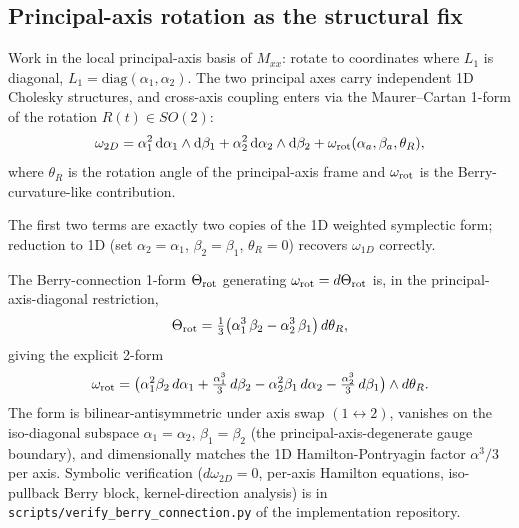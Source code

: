 \documentclass[11pt]{article}
\newcommand{\dd}{\mathrm{d}}
\begin{document}
\subsection{Principal-axis rotation as the structural fix}

Work in the local principal-axis basis of $M_{xx}$: rotate to
coordinates where $L_1$ is diagonal, $L_1 = \mathrm{diag}(\alpha_1,
\alpha_2)$. The two principal axes carry independent 1D Cholesky
structures, and cross-axis coupling enters via the Maurer--Cartan
1-form of the rotation $R(t)\in SO(2)$:
\begin{equation}
  \omega_{2D} = \alpha_1^2\,\dd\alpha_1\wedge\dd\beta_1
  + \alpha_2^2\,\dd\alpha_2\wedge\dd\beta_2 + \omega_{\rm rot}(\alpha_a,\beta_a,\theta_R),
  \label{eq:omega-2D}
\end{equation}
where $\theta_R$ is the rotation angle of the principal-axis frame
and $\omega_{\rm rot}$ is the Berry-curvature-like contribution.

The first two terms are exactly two copies of the 1D weighted
symplectic form; reduction to 1D (set $\alpha_2=\alpha_1$,
$\beta_2=\beta_1$, $\theta_R=0$) recovers $\omega_{1D}$ correctly.

The Berry-connection 1-form $\Theta_{\rm rot}$ generating
$\omega_{\rm rot} = d\Theta_{\rm rot}$ is, in the principal-axis-diagonal restriction,
\begin{equation}
  \Theta_{\rm rot} = \tfrac{1}{3}\bigl(\alpha_1^3\,\beta_2 - \alpha_2^3\,\beta_1\bigr)\,d\theta_R,
  \label{eq:Theta-rot-2D}
\end{equation}
giving the explicit 2-form
\begin{equation}
  \omega_{\rm rot} = \bigl(\alpha_1^2\beta_2\,d\alpha_1 + \tfrac{\alpha_1^3}{3}\,d\beta_2
                          - \alpha_2^2\beta_1\,d\alpha_2 - \tfrac{\alpha_2^3}{3}\,d\beta_1\bigr)
                    \wedge d\theta_R.
  \label{eq:omega-rot-2D}
\end{equation}
The form is bilinear-antisymmetric under axis swap $(1\leftrightarrow 2)$, vanishes
on the iso-diagonal subspace $\alpha_1=\alpha_2,\,\beta_1=\beta_2$ (the principal-axis-degenerate
gauge boundary), and dimensionally matches the 1D Hamilton-Pontryagin
factor $\alpha^3/3$ per axis. Symbolic verification ($d\omega_{2D} = 0$,
per-axis Hamilton equations, iso-pullback Berry block,
kernel-direction analysis) is in
\texttt{scripts/verify\_berry\_connection.py} of the implementation
repository.
\end{document}
